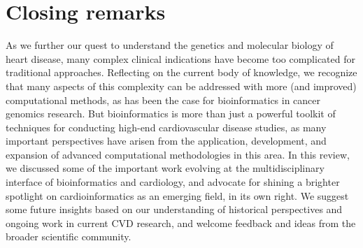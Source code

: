 \documentclass[letter]{bioinfo}
\begin{document}
	

	

	
	

	
	
	
	

	


	
	
	
	
	\section*{Closing remarks}
	As we further our quest to understand the genetics and molecular biology of heart disease, many complex clinical indications have become too complicated for traditional approaches. Reflecting on the current body of knowledge, we recognize that many aspects of this complexity can be addressed with more (and improved) computational methods, as has been the case for bioinformatics in cancer genomics research.  But bioinformatics is more than just a powerful toolkit of techniques for conducting high-end cardiovascular disease studies, as many important perspectives have arisen from the application, development, and expansion of advanced computational methodologies in this area.  In this review, we discussed some of the important work evolving at the multidisciplinary interface of bioinformatics and cardiology, and advocate for shining a brighter spotlight on cardioinformatics as an emerging field, in its own right.  We suggest some future insights based on our understanding of historical perspectives and ongoing work in current CVD research, and welcome feedback and ideas from the broader scientific community.
\end{document}
